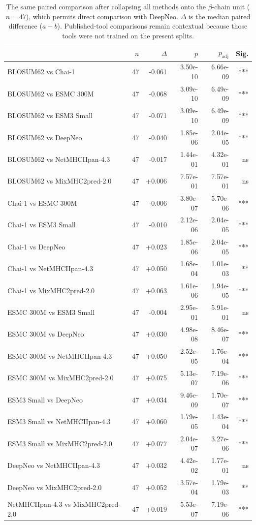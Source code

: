 \begin{table}[H]
\centering
\small
\caption{The same paired comparison after collapsing all methods onto the $\beta$-chain unit ($n=47$), which permits direct comparison with DeepNeo. $\Delta$ is the median paired difference ($a-b$). Published-tool comparisons remain contextual because those tools were not trained on the present splits.}
\label{tab:supp-ref-pairs-beta}
\begin{tabular}{lrrrrr}
\toprule
 & \textbf{$n$} & \textbf{$\Delta$} & \textbf{$p$} & \textbf{$p_{\mathrm{adj}}$} & \textbf{Sig.} \\
\midrule
BLOSUM62 vs Chai-1 & 47 & -0.061 & 3.50e-10 & 6.66e-09 & *** \\
BLOSUM62 vs ESMC 300M & 47 & -0.068 & 3.09e-10 & 6.49e-09 & *** \\
BLOSUM62 vs ESM3 Small & 47 & -0.071 & 3.09e-10 & 6.49e-09 & *** \\
BLOSUM62 vs DeepNeo & 47 & -0.040 & 1.85e-06 & 2.04e-05 & *** \\
BLOSUM62 vs NetMHCIIpan-4.3 & 47 & -0.017 & 1.44e-01 & 4.32e-01 & ns \\
BLOSUM62 vs MixMHC2pred-2.0 & 47 & +0.006 & 7.57e-01 & 7.57e-01 & ns \\
Chai-1 vs ESMC 300M & 47 & -0.006 & 3.80e-07 & 5.70e-06 & *** \\
Chai-1 vs ESM3 Small & 47 & -0.010 & 2.12e-06 & 2.04e-05 & *** \\
Chai-1 vs DeepNeo & 47 & +0.023 & 1.85e-06 & 2.04e-05 & *** \\
Chai-1 vs NetMHCIIpan-4.3 & 47 & +0.050 & 1.68e-04 & 1.01e-03 & ** \\
Chai-1 vs MixMHC2pred-2.0 & 47 & +0.063 & 1.61e-06 & 1.94e-05 & *** \\
ESMC 300M vs ESM3 Small & 47 & -0.004 & 2.95e-01 & 5.91e-01 & ns \\
ESMC 300M vs DeepNeo & 47 & +0.030 & 4.98e-08 & 8.46e-07 & *** \\
ESMC 300M vs NetMHCIIpan-4.3 & 47 & +0.050 & 2.52e-05 & 1.76e-04 & *** \\
ESMC 300M vs MixMHC2pred-2.0 & 47 & +0.075 & 5.13e-07 & 7.19e-06 & *** \\
ESM3 Small vs DeepNeo & 47 & +0.034 & 9.46e-09 & 1.70e-07 & *** \\
ESM3 Small vs NetMHCIIpan-4.3 & 47 & +0.060 & 1.79e-05 & 1.43e-04 & *** \\
ESM3 Small vs MixMHC2pred-2.0 & 47 & +0.077 & 2.04e-07 & 3.27e-06 & *** \\
DeepNeo vs NetMHCIIpan-4.3 & 47 & +0.032 & 4.42e-02 & 1.77e-01 & ns \\
DeepNeo vs MixMHC2pred-2.0 & 47 & +0.052 & 3.57e-04 & 1.79e-03 & ** \\
NetMHCIIpan-4.3 vs MixMHC2pred-2.0 & 47 & +0.019 & 5.53e-07 & 7.19e-06 & *** \\
\bottomrule
\end{tabular}
\end{table}

